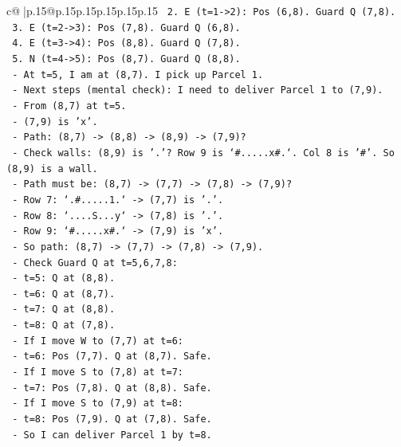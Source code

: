 \documentclass{article}
\begin{document}
{\begin{supertabular}{c@{$\;$}|p{.15\linewidth}@{}p{.15\linewidth}p{.15\linewidth}p{.15\linewidth}p{.15\linewidth}p{.15\linewidth}}
{{{\texttt{      2. E (t=1{-}>2): Pos (6,8). Guard Q (7,8).} \\
\texttt{      3. E (t=2{-}>3): Pos (7,8). Guard Q (6,8).} \\
\texttt{      4. E (t=3{-}>4): Pos (8,8). Guard Q (7,8).} \\
\texttt{      5. N (t=4{-}>5): Pos (8,7). Guard Q (8,8).} \\
\texttt{    {-} At t=5, I am at (8,7). I pick up Parcel 1.} \\
\texttt{    {-} Next steps (mental check): I need to deliver Parcel 1 to (7,9).} \\
\texttt{      {-} From (8,7) at t=5.} \\
\texttt{      {-} (7,9) is 'x'.} \\
\texttt{      {-} Path: (8,7) {-}> (8,8) {-}> (8,9) {-}> (7,9)?} \\
\texttt{      {-} Check walls: (8,9) is '.'? Row 9 is `\#.....x\#.`. Col 8 is '\#'. So (8,9) is a wall.} \\
\texttt{      {-} Path must be: (8,7) {-}> (7,7) {-}> (7,8) {-}> (7,9)?} \\
\texttt{      {-} Row 7: `.\#.....1.` {-}> (7,7) is '.'.} \\
\texttt{      {-} Row 8: `....S...y` {-}> (7,8) is '.'.} \\
\texttt{      {-} Row 9: `\#.....x\#.` {-}> (7,9) is 'x'.} \\
\texttt{      {-} So path: (8,7) {-}> (7,7) {-}> (7,8) {-}> (7,9).} \\
\texttt{      {-} Check Guard Q at t=5,6,7,8:} \\
\texttt{        {-} t=5: Q at (8,8).} \\
\texttt{        {-} t=6: Q at (8,7).} \\
\texttt{        {-} t=7: Q at (8,8).} \\
\texttt{        {-} t=8: Q at (7,8).} \\
\texttt{      {-} If I move W to (7,7) at t=6:} \\
\texttt{        {-} t=6: Pos (7,7). Q at (8,7). Safe.} \\
\texttt{      {-} If I move S to (7,8) at t=7:} \\
\texttt{        {-} t=7: Pos (7,8). Q at (8,8). Safe.} \\
\texttt{      {-} If I move S to (7,9) at t=8:} \\
\texttt{        {-} t=8: Pos (7,9). Q at (7,8). Safe.} \\
\texttt{      {-} So I can deliver Parcel 1 by t=8.} \\
}}}
\end{supertabular}}
\end{document}
